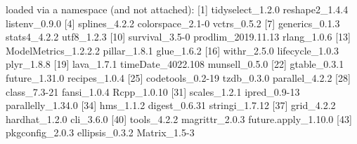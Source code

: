 \documentclass[
]{article}
\newenvironment{Shaded}{\begin{snugshade}}{\end{snugshade}}
\newcommand{\DecValTok}[1]{\textcolor[rgb]{0.00,0.00,0.81}{#1}}
\newcommand{\FloatTok}[1]{\textcolor[rgb]{0.00,0.00,0.81}{#1}}
\newcommand{\FunctionTok}[1]{\textcolor[rgb]{0.00,0.00,0.00}{#1}}
\newcommand{\NormalTok}[1]{#1}
\newcommand{\SpecialCharTok}[1]{\textcolor[rgb]{0.00,0.00,0.00}{#1}}
\begin{document}
\begin{Shaded}
\begin{Highlighting}[]
\NormalTok{loaded via a }\FunctionTok{namespace}\NormalTok{ (and not attached)}\SpecialCharTok{:}
\NormalTok{ [}\DecValTok{1}\NormalTok{] tidyselect\_1.}\FloatTok{2.0}\NormalTok{     reshape2\_1.}\FloatTok{4.4}\NormalTok{       listenv\_0.}\FloatTok{9.0}       
\NormalTok{ [}\DecValTok{4}\NormalTok{] splines\_4.}\FloatTok{2.2}\NormalTok{        colorspace\_2}\FloatTok{.1}\DecValTok{{-}0}\NormalTok{     vctrs\_0.}\FloatTok{5.2}         
\NormalTok{ [}\DecValTok{7}\NormalTok{] generics\_0.}\FloatTok{1.3}\NormalTok{       stats4\_4.}\FloatTok{2.2}\NormalTok{         utf8\_1.}\FloatTok{2.3}          
\NormalTok{[}\DecValTok{10}\NormalTok{] survival\_3}\FloatTok{.5}\DecValTok{{-}0}\NormalTok{       prodlim\_2019.}\FloatTok{11.13}\NormalTok{   rlang\_1.}\FloatTok{0.6}         
\NormalTok{[}\DecValTok{13}\NormalTok{] ModelMetrics\_1.}\DecValTok{2}\NormalTok{.}\FloatTok{2.2}\NormalTok{ pillar\_1.}\FloatTok{8.1}\NormalTok{         glue\_1.}\FloatTok{6.2}          
\NormalTok{[}\DecValTok{16}\NormalTok{] withr\_2.}\FloatTok{5.0}\NormalTok{          lifecycle\_1.}\FloatTok{0.3}\NormalTok{      plyr\_1.}\FloatTok{8.8}          
\NormalTok{[}\DecValTok{19}\NormalTok{] lava\_1.}\FloatTok{7.1}\NormalTok{           timeDate\_4022}\FloatTok{.108}\NormalTok{    munsell\_0.}\FloatTok{5.0}       
\NormalTok{[}\DecValTok{22}\NormalTok{] gtable\_0.}\FloatTok{3.1}\NormalTok{         future\_1.}\FloatTok{31.0}\NormalTok{        recipes\_1.}\FloatTok{0.4}       
\NormalTok{[}\DecValTok{25}\NormalTok{] codetools\_0}\FloatTok{.2}\DecValTok{{-}19}\NormalTok{     tzdb\_0.}\FloatTok{3.0}\NormalTok{           parallel\_4.}\FloatTok{2.2}      
\NormalTok{[}\DecValTok{28}\NormalTok{] class\_7}\FloatTok{.3}\DecValTok{{-}21}\NormalTok{         fansi\_1.}\FloatTok{0.4}\NormalTok{          Rcpp\_1.}\FloatTok{0.10}         
\NormalTok{[}\DecValTok{31}\NormalTok{] scales\_1.}\FloatTok{2.1}\NormalTok{         ipred\_0}\FloatTok{.9}\DecValTok{{-}13}\NormalTok{         parallelly\_1.}\FloatTok{34.0}   
\NormalTok{[}\DecValTok{34}\NormalTok{] hms\_1.}\FloatTok{1.2}\NormalTok{            digest\_0.}\FloatTok{6.31}\NormalTok{        stringi\_1.}\FloatTok{7.12}      
\NormalTok{[}\DecValTok{37}\NormalTok{] grid\_4.}\FloatTok{2.2}\NormalTok{           hardhat\_1.}\FloatTok{2.0}\NormalTok{        cli\_3.}\FloatTok{6.0}           
\NormalTok{[}\DecValTok{40}\NormalTok{] tools\_4.}\FloatTok{2.2}\NormalTok{          magrittr\_2.}\FloatTok{0.3}\NormalTok{       future.apply\_1.}\FloatTok{10.0} 
\NormalTok{[}\DecValTok{43}\NormalTok{] pkgconfig\_2.}\FloatTok{0.3}\NormalTok{      ellipsis\_0.}\FloatTok{3.2}\NormalTok{       Matrix\_1}\FloatTok{.5}\DecValTok{{-}3}        

\end{Highlighting}
\end{Shaded}
\end{document}
